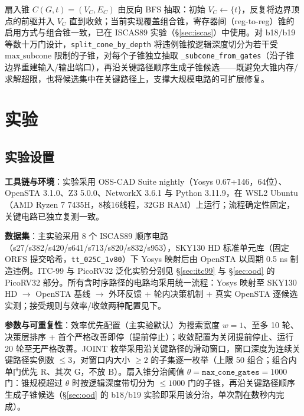 \documentclass[journal]{IEEEtran}
\begin{document}
扇入锥 $C(G, t) = (V_C, E_C)$ 由反向 BFS 抽取：初始 $V_C \leftarrow \{t\}$，反复将边界顶点的前驱并入 $V_C$ 直到收敛；当前实现覆盖组合锥，寄存器间（reg-to-reg）锥的启用方式与组合锥一致，已在 ISCAS89 实验（\S\ref{sec:iscas}）中使用。对 b18/b19 等数十万门设计，\texttt{split\_cone\_by\_depth} 将违例锥按逻辑深度切分为若干受 $\mathrm{max\_subcone}$ 限制的子锥，对每个子锥独立抽取 \texttt{\_subcone\_from\_gates}（沿子锥边界重建输入/输出端口），再沿关键路径顺序生成子锥候选——既避免大锥内存/求解超限，也将候选集中在关键路径上，支撑大规模电路的可扩展修复。

\section{实验}\label{sec:exp}

\subsection{实验设置}\label{sec:setup}

\textbf{工具链与环境}：实验采用 OSS-CAD Suite nightly（Yosys 0.67+146，64位）、OpenSTA 3.1.0、Z3 5.0.0、NetworkX 3.6.1 与 Python 3.11.9，在 WSL2 Ubuntu（AMD Ryzen 7 7435H，8核16线程，32GB RAM）上运行；流程确定性固定，关键电路已独立复测一致。

\textbf{数据集}：主实验采用 8 个 ISCAS89 顺序电路（s27/s382/s420/s641/s713/s820/s832/s953），SKY130 HD 标准单元库（固定 ORFS 提交哈希，\texttt{tt\_025C\_1v80}）下 Yosys 映射后由 OpenSTA 以周期 0.5 ns 制造违例。ITC-99 与 PicoRV32 泛化实验分别见 \S\ref{sec:itc99} 与 \S\ref{sec:ood} 的 PicoRV32 部分。所有含时序路径的电路均采用统一流程：Yosys 映射至 SKY130 HD $\rightarrow$ OpenSTA 基线 $\rightarrow$ 外环反馈 + 轮内决策机制 + 真实 OpenSTA 逐候选实测；接受规则与效率/收敛两种配置见下。

\textbf{参数与可重复性}：效率优先配置（主实验默认）为搜索宽度 $w=1$、至多 10 轮、决策层排序 + 首个严格改善即停（提前停止）；收敛配置为关闭提前停止、运行 20 轮至无严格改善。JOINT 枚举采用沿关键路径的滑动窗口，窗口深度为连续关键路径实例数 $\le 3$，对窗口内大小 $\ge 2$ 的子集逐一枚举（上限 50 组合；组合内单门优先 R、其次 G，不放 B）。扇入锥分治阈值 $\theta = \texttt{max\_cone\_gates} = 1000$ 门：锥规模超过 $\theta$ 时按逻辑深度带切分为 $\le 1000$ 门的子锥，再沿关键路径顺序生成子锥候选（\S\ref{sec:ood} 的 b18/b19 实验即采用该分治，单次割在数秒内完成）。
\end{document}
